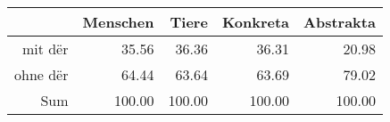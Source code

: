 \begin{tabular}{rrrrr}
  \hline
 & Menschen & Tiere & Konkreta & Abstrakta \\ 
  \hline
mit dër & 35.56 & 36.36 & 36.31 & 20.98 \\ 
  ohne dër & 64.44 & 63.64 & 63.69 & 79.02 \\ 
  Sum & 100.00 & 100.00 & 100.00 & 100.00 \\ 
   \hline
\end{tabular}
